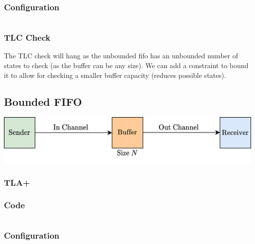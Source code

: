 \subsubsection{Configuration}
\inputminted{text}{tla_plus/code/UnboundedFIFO.cfg}
\subsubsection{TLC Check}
The TLC check will hang as the unbounded fifo has an unbounded number of states to check (as the buffer can be any size). We can add a constraint to bound it to allow for checking a smaller buffer capacity (reduces possible states).

\subsection{Bounded FIFO}
\begin{center}
    \includegraphics[width=.8\textwidth]{tla_plus/images/bounded_FIFO.drawio.png}
\end{center}
\subsubsection{TLA+}

\subsubsection{Code}
\inputminted{text}{tla_plus/code/BoundedFIFO.tla}
\subsubsection{Configuration}
\inputminted{text}{tla_plus/code/BoundedFIFO.cfg}
